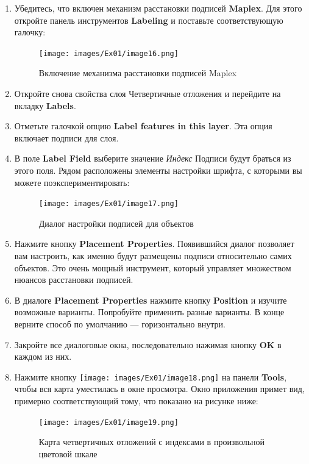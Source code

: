 \documentclass[12pt,]{book}
\begin{document}
\begin{enumerate}
\def\labelenumi{\arabic{enumi}.}
\item
  Убедитесь, что включен механизм расстановки подписей \textbf{Maplex}. Для этого откройте панель инструментов \textbf{Labeling} и поставьте соответствующую галочку:

  \begin{figure}
  \centering
  \texttt{[image: images/Ex01/image16.png]}
  \caption{Включение механизма расстановки подписей Maplex}
  \end{figure}
\item
  Откройте снова свойства слоя Четвертичные отложения и перейдите на вкладку \textbf{Labels}.
\item
  Отметьте галочкой опцию \textbf{Label features in this layer}. Эта опция включает подписи для слоя.
\item
  В поле \textbf{Label Field} выберите значение \emph{Индекс} Подписи будут браться из этого поля. Рядом расположены элементы настройки шрифта, с которыми вы можете поэкспериментировать:

  \begin{figure}
  \centering
  \texttt{[image: images/Ex01/image17.png]}
  \caption{Диалог настройки подписей для объектов}
  \end{figure}
\item
  Нажмите кнопку \textbf{Placement Properties}. Появившийся диалог позволяет вам настроить, как именно будут размещены подписи относительно самих объектов. Это очень мощный инструмент, который управляет множеством нюансов расстановки подписей.
\item
  В диалоге \textbf{Placement Properties} нажмите кнопку \textbf{Position} и изучите возможные варианты. Попробуйте применить разные варианты. В конце верните способ по умолчанию --- горизонтально внутри.
\item
  Закройте все диалоговые окна, последовательно нажимая кнопку \textbf{OK} в каждом из них.
\item
  Нажмите кнопку \texttt{[image: images/Ex01/image18.png]} на панели \textbf{Tools}, чтобы вся карта уместилась в окне просмотра. Окно приложения примет вид, примерно соответствующий тому, что показано на рисунке ниже:

  \begin{figure}
  \centering
  \texttt{[image: images/Ex01/image19.png]}
  \caption{Карта четвертичных отложений с индексами в произвольной цветовой шкале}
  \end{figure}
\end{enumerate}
\end{document}
